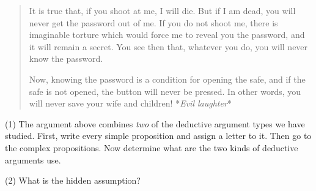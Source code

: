 \documentclass[a4paper, 12pt]{article}
\begin{document}
\begin{quote}
    It is true that, if you shoot at me, I will die. But if I am dead, 
    you will never get the password out of me. If you do not shoot me,
    there is imaginable torture which would force me to reveal you the 
    password, and it will remain a secret. You see then that, whatever you 
    do, you will never know the password.

    Now, knowing the password is a condition for opening the safe, 
    and if the safe is not opened, the button will never be pressed. 
    In other words, you will never save your wife and children! *\textit{Evil
    laughter}*
\end{quote}

(1) The argument above combines \textit{two} of the deductive argument types we
have studied. First, write every simple proposition and assign a letter 
to it. Then go to the complex propositions. Now determine what are the 
two kinds of deductive arguments use.

(2) What is the hidden assumption?
\end{document}

